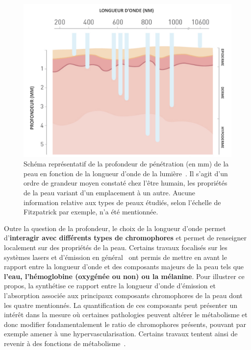 \begin{figure}[H]
    \centering
    \includegraphics[width=0.95\linewidth]{contents/chapter_2/resources/scheme_light_penatrating.pdf}
    \caption{Schéma représentatif de la profondeur de pénétration (en mm) de la peau en fonction de la longueur d’onde de la lumière~\cite{Barolet2008}. Il s'agit d'un ordre de grandeur moyen constaté chez l'être humain, les propriétés de la peau variant d'un emplacement à un autre. Aucune information relative aux types de peaux étudiés, selon l'échelle de Fitzpatrick par exemple, n'a été mentionnée.}
    \label{fig:scheme_light_penatrating}
\end{figure}\par

Outre la question de la profondeur, le choix de la longueur d'onde permet d'\textbf{interagir avec différents types de chromophores} et permet de renseigner localement sur des propriétés de la peau. Certains travaux focalisés sur les systèmes lasers et d'émission en général~\cite{Stewart2013} ont permis de mettre en avant le rapport entre la longueur d'onde et des composants majeurs de la peau tels que \textbf{l'eau, l'hémoglobine (oxygénée ou non) ou la mélanine}. Pour illustrer ce propos, la  synthétise ce rapport entre la longueur d'onde d'émission et l'absorption associée aux principaux composants chromophores de la peau dont les quatre mentionnés. La quantification de ces composants peut présenter un intérêt dans la mesure où certaines pathologies peuvent altérer le métabolisme et donc modifier fondamentalement le ratio de chromophores présents, pouvant par exemple amener à une hypervascularisation. Certains travaux tentent ainsi de revenir à des fonctions de métabolisme~\cite{Im2016}.\par

